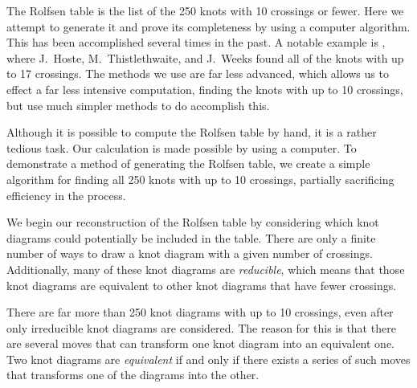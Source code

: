 \begin{paper}

The Rolfsen table is the list of the 250 knots with 10 crossings or fewer.
Here we attempt to generate it and prove its completeness by using a computer
algorithm.
This has been accomplished several times in the past.
A notable example is \cite{htw}, where J.~Hoste, M.~Thistlethwaite, and J.~Weeks
found all of the knots with up to 17 crossings.
The methods we use are far less advanced, which allows us to effect a far less
intensive computation, finding the knots with up to 10 crossings, but use much
simpler methods to do accomplish this.

Although it is possible to compute the Rolfsen table by hand, it is a rather
tedious task.
Our calculation is made possible by using a computer.
To demonstrate a method of generating the Rolfsen table, we create a simple
algorithm for finding all 250 knots with up to 10 crossings, partially
sacrificing efficiency in the process.

We begin our reconstruction of the Rolfsen table by considering which knot
diagrams could potentially be included in the table.
There are only a finite number of ways to draw a knot diagram with a given
number of crossings.
Additionally, many of these knot diagrams are \textit{reducible}, which means
that those knot diagrams are equivalent to other knot diagrams that have fewer
crossings.

There are far more than 250 knot diagrams with up to 10 crossings, even after
only irreducible knot diagrams are considered.
The reason for this is that there are several moves that can transform one knot
diagram into an equivalent one.
Two knot diagrams are \textit{equivalent} if and only if there exists a series
of such moves that transforms one of the diagrams into the other.


\end{paper}
